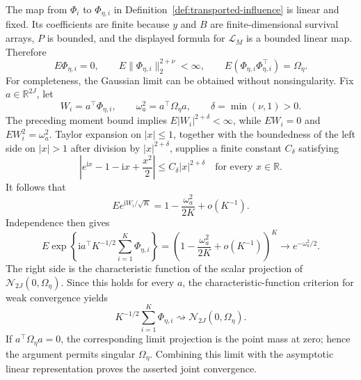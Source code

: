 The map from \(\Phi_i\) to \(\Phi_{\eta,i}\) in Definition~\ref{def:transported-influence} is linear and fixed. Its coefficients are finite because \(y\) and \(B\) are finite-dimensional survival arrays, \(P\) is bounded, and the displayed formula for \(\mathcal L_M\) is a bounded linear map. Therefore
\[
 E\Phi_{\eta,i}=0,
 \qquad
 E\|\Phi_{\eta,i}\|_2^{2+\nu}<\infty,
 \qquad
 E(\Phi_{\eta,i}\Phi_{\eta,i}^\top)=\Omega_\eta.
\]
For completeness, the Gaussian limit can be obtained without nonsingularity. Fix \(a\in\mathbb R^{2J}\), let
\[
 W_i=a^\top\Phi_{\eta,i},
 \qquad
 \omega_a^2=a^\top\Omega_\eta a,
 \qquad
 \delta=\min(\nu,1)>0.
\]
The preceding moment bound implies \(E|W_i|^{2+\delta}<\infty\), while \(EW_i=0\) and \(EW_i^2=\omega_a^2\). Taylor expansion on \(|x|\le1\), together with the boundedness of the left side on \(|x|>1\) after division by \(|x|^{2+\delta}\), supplies a finite constant \(C_\delta\) satisfying
\[
 \left|e^{\mathrm i x}-1-\mathrm i x+\frac{x^2}{2}\right|
 \le C_\delta |x|^{2+\delta}
 \quad\text{for every }x\in\mathbb R.
\]
It follows that
\[
 E e^{\mathrm iW_i/\sqrt K}
 =1-\frac{\omega_a^2}{2K}+o(K^{-1}).
\]
Independence then gives
\[
 E\exp\!\left\{\mathrm i a^\top K^{-1/2}
                   \sum_{i=1}^K\Phi_{\eta,i}\right\}
 =\left(1-\frac{\omega_a^2}{2K}+o(K^{-1})\right)^K
 \longrightarrow e^{-\omega_a^2/2}.
\]
The right side is the characteristic function of the scalar projection of \(\mathcal N_{2J}(0,\Omega_\eta)\). Since this holds for every \(a\), the characteristic-function criterion for weak convergence yields
\[
 K^{-1/2}\sum_{i=1}^K\Phi_{\eta,i}
 \rightsquigarrow \mathcal N_{2J}(0,\Omega_\eta).
\]
If \(a^\top\Omega_\eta a=0\), the corresponding limit projection is the point mass at zero; hence the argument permits singular \(\Omega_\eta\). Combining this limit with the asymptotic linear representation proves the asserted joint convergence.


